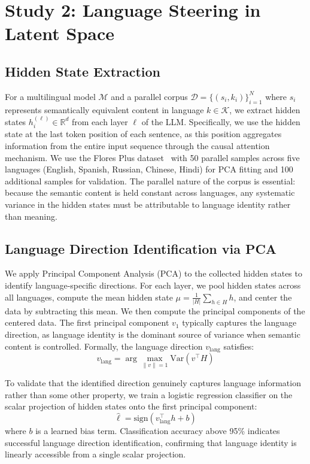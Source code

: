 \section{Study 2: Language Steering in Latent Space}

\subsection{Hidden State Extraction}

For a multilingual model $\mathcal{M}$ and a parallel corpus $\mathcal{D} = \{(s_i, k_i)\}_{i=1}^N$ where $s_i$ represents semantically equivalent content in language $k \in \mathcal{K}$, we extract hidden states $h_i^{(\ell)} \in \mathbb{R}^d$ from each layer $\ell$ of the LLM. Specifically, we use the hidden state at the last token position of each sentence, as this position aggregates information from the entire input sequence through the causal attention mechanism. We use the Flores Plus dataset~\cite{nllb2024} with 50 parallel samples across five languages (English, Spanish, Russian, Chinese, Hindi) for PCA fitting and 100 additional samples for validation. The parallel nature of the corpus is essential: because the semantic content is held constant across languages, any systematic variance in the hidden states must be attributable to language identity rather than meaning.

\subsection{Language Direction Identification via PCA}

We apply Principal Component Analysis (PCA) to the collected hidden states to identify language-specific directions. For each layer, we pool hidden states across all languages, compute the mean hidden state $\mu = \frac{1}{|H|}\sum_{h \in H} h$, and center the data by subtracting this mean. We then compute the principal components of the centered data. The first principal component $v_1$ typically captures the language direction, as language identity is the dominant source of variance when semantic content is controlled. Formally, the language direction $v_{\text{lang}}$ satisfies:
\begin{equation}
    v_{\text{lang}} = \arg\max_{\|v\|=1} \text{Var}(v^\top H)
\end{equation}

To validate that the identified direction genuinely captures language information rather than some other property, we train a logistic regression classifier on the scalar projection of hidden states onto the first principal component:
\begin{equation}
    \hat{\ell} = \text{sign}(v_{\text{lang}}^\top h + b)
\end{equation}
where $b$ is a learned bias term. Classification accuracy above 95\% indicates successful language direction identification, confirming that language identity is linearly accessible from a single scalar projection.

